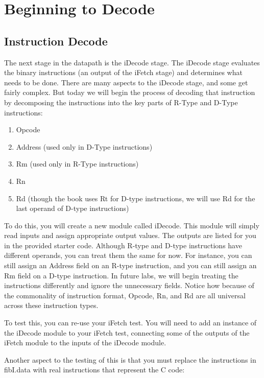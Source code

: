 \chapter{Beginning to Decode}

\section{Instruction Decode}

The next stage in the datapath is the iDecode stage.  The iDecode stage evaluates the binary instructions (an output of the iFetch stage) and determines what needs to be done.  There are many aspects to the iDecode stage, and some get fairly complex.  But today we will begin the process of decoding that instruction by decomposing the instructions into the key parts of R-Type and D-Type instructions:
\begin{enumerate}
	\item Opcode
	\item Address (used only in D-Type instructions)
	\item Rm (used only in R-Type instructions)
	\item Rn
	\item Rd (though the book uses Rt for D-type instructions, we will use Rd for the last operand of D-type instructions)
\end{enumerate}   

To do this, you will create a new module called iDecode.  This module will simply read inputs and assign appropriate output values.  The outputs are listed for you in the provided starter code.  Although R-type and D-type instructions have different operands, you can treat them the same for now.  For instance, you can still assign an Address field on an R-type instruction, and you can still assign an Rm field on a D-type instruction.  In future labs, we will begin treating the instructions differently and ignore the unnecessary fields.  Notice how because of the commonality of instruction format, Opcode, Rn, and Rd are all universal across these instruction types.


To test this, you can re-use your iFetch test.  You will need to add an instance of the iDecode module to your iFetch test, connecting some of the outputs of the iFetch module to the inputs of the iDecode module.

Another aspect to the testing of this is that you must replace the instructions in fibI.data with real instructions that represent the C code:

